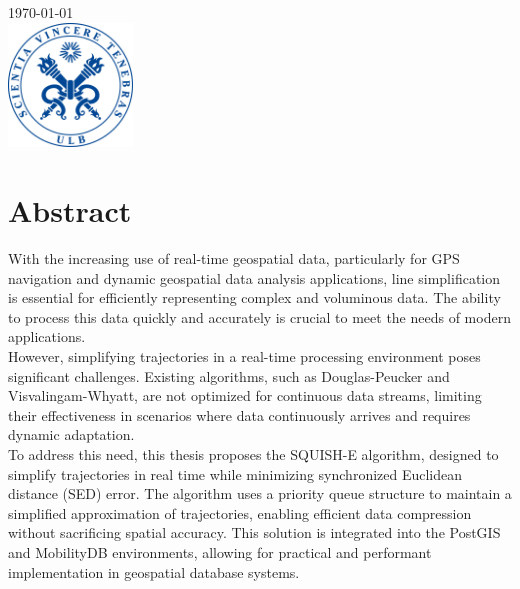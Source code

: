 \documentclass[twoside,12pt, a4paper]{report}
\begin{document}
\begin{titlepage}

{\large \today}\\[1cm] %


\includegraphics[width=3.3cm, height=3.3cm]{sceau-a-quadri.jpg}%
 

\end{titlepage}


\section*{Abstract}

With the increasing use of real-time geospatial data, particularly for GPS navigation and dynamic geospatial data analysis applications, line simplification is essential for efficiently representing complex and voluminous data. The ability to process this data quickly and accurately is crucial to meet the needs of modern applications.\\

However, simplifying trajectories in a real-time processing environment poses significant challenges. Existing algorithms, such as Douglas-Peucker and Visvalingam-Whyatt, are not optimized for continuous data streams, limiting their effectiveness in scenarios where data continuously arrives and requires dynamic adaptation.\\

To address this need, this thesis proposes the SQUISH-E algorithm, designed to simplify trajectories in real time while minimizing synchronized Euclidean distance (SED) error. The algorithm uses a priority queue structure to maintain a simplified approximation of trajectories, enabling efficient data compression without sacrificing spatial accuracy. This solution is integrated into the PostGIS and MobilityDB environments, allowing for practical and performant implementation in geospatial database systems.\\
\end{document}
